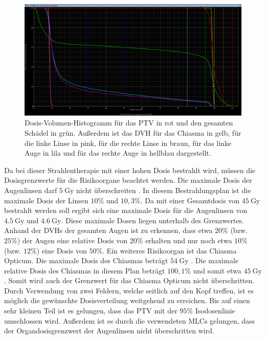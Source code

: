 \begin{figure}[H]
  \centering
  \includegraphics[width=\textwidth]{Bilder/Hirn_DVH.png}
  \caption{Dosis-Volumen-Histogramm für das PTV in rot und den gesamten Schädel in grün. Außerdem ist das DVH für das Chiasma in gelb, für die linke Linse in pink, für die rechte Linse in braun, für das linke Auge in lila und für das rechte Auge in hellblau dargestellt.}
  \label{abb:DVH}
\end{figure}

Da bei dieser Strahlentherapie mit einer hohen Dosis bestrahlt wird, müssen die Dosisgrenzwerte für
die Risikoorgane beachtet werden. Die maximale Dosis der Augenlinsen darf $\SI{5}{\gray}$ nicht überschreiten \cite{grenz}.
In diesem Bestrahlungsplan ist die maximale Dosis der Linsen $10\%$ und $10,3\%$. Da mit einer Gesamtdosis von $\SI{45}{\gray}$ bestrahlt werden
soll ergibt sich eine maximale Dosis für die Augenlinsen von $\SI{4.5}{\gray}$ und $\SI{4.6}{\gray}$. Diese maximale Dosen liegen unterhalb des Grenzwertes.
Anhand der DVHs der gesamten Augen ist zu erkennen, dass etwa $20\%$ (bzw. $25\%$) der Augen eine relative Dosis von $20\%$ erhalten und nur noch etwa
$10\%$ (bzw. $12\%$) eine Dosis von $50\%$. Ein weiteres Risikoorgan ist das Chiasma Opticum. Die maximale Dosis des Chiasmas beträgt $\SI{54}{\gray}$
\cite{grenz}. Die maximale relative Dosis des Chiasmas in diesem Plan beträgt $100,1\%$ und somit etwa $\SI{45}{\gray}$. Somit wird auch der Grenzwert
für das Chiasma Opticum nicht überschritten. \\

Durch Verwendung von zwei Feldern, welche seitlich auf den Kopf treffen, ist es möglich
die gewünschte Dosisverteilung weitgehend zu erreichen. Bis auf einen sehr kleinen Teil ist
es gelungen, dass das PTV mit der $95\%$ Isodosenlinie umschlossen wird. Außerdem ist es durch die
verwendeten MLCs gelungen, dass der Organdosisgrenzwert der Augenlinsen nicht überschritten wird.
